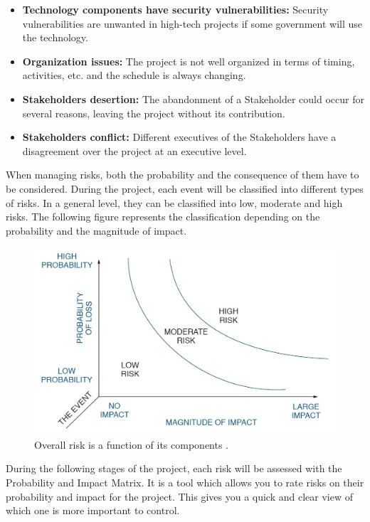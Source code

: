 \begin{itemize}
	\item \textbf{Technology components have security vulnerabilities:} Security vulnerabilities are unwanted in high-tech projects if some government will use the technology.
	
	\item \textbf{Organization issues:} The project is not well organized in terms of timing, activities, etc. and the schedule is always changing.
	
	\item \textbf{Stakeholders desertion:} The abandonment of a Stakeholder could occur for several reasons, leaving the project without its contribution.
	
	\item \textbf{Stakeholders conflict:} Different executives of the Stakeholders have a disagreement over the project at an executive level.
	
	
\end{itemize}

When managing risks, both the probability and the consequence of them have to be considered. During the project, each event will be classified into different types of risks. In a general level, they can be classified into low, moderate and high risks. The following figure represents the classification depending on the probability and the magnitude of impact.

\begin{figure}[H]
	\centering
	\includegraphics[width=0.65\linewidth]{./images/risks1}
	\caption{Overall risk is a function of its components \cite{Kerzner2009}.}
	\label{fig:risks1}
\end{figure}

During the following stages of the project, each risk will be assessed with the Probability and Impact Matrix. It is a tool which allows you to rate risks on their probability and impact for the project. This gives you a quick and clear view of which one is more important to control.

